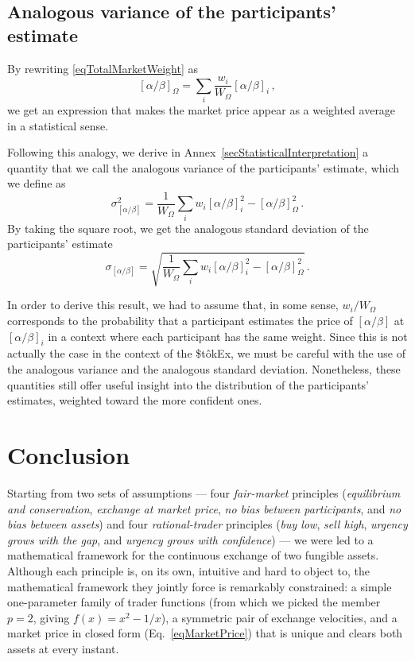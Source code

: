 \documentclass[letterpaper]{article}
\newcommand{\priceAB}{\left[\alpha / \beta\right]}
\newcommand{\StokEx}{\$t\^{o}kEx}
\begin{document}
\subsection{Analogous variance of the participants' estimate}

By rewriting \eqref{eqTotalMarketWeight} as
\begin{equation}
    \priceAB_\Omega = \sum_i \frac{w_i}{W_\Omega} \priceAB_i\,,
\end{equation}
we get an expression that makes the market price appear as a weighted average in a statistical sense.

Following this analogy, we derive in Annex~\ref{secStatisticalInterpretation} a quantity that we call the analogous variance of the participants' estimate, which we define as
\begin{equation}
    \sigma_{\priceAB}^2 = \frac{1}{W_\Omega} \sum_i w_i \priceAB_i^2 - \priceAB_\Omega^2\,.
\end{equation}
By taking the square root, we get the analogous standard deviation of the participants' estimate
\begin{equation}
    \sigma_{\priceAB} = \sqrt{\frac{1}{W_\Omega} \sum_i w_i \priceAB_i^2 - \priceAB_\Omega^2}\,.
\end{equation}

In order to derive this result, we had to assume that, in some sense, $w_i/W_\Omega$ corresponds to the probability that a participant estimates the price of $\priceAB$ at $\priceAB_i$ in a context where each participant has the same weight. Since this is not actually the case in the context of the \StokEx{}, we must be careful with the use of the analogous variance and the analogous standard deviation. Nonetheless, these quantities still offer useful insight into the distribution of the participants' estimates, weighted toward the more confident ones.

\section{Conclusion}

Starting from two sets of assumptions --- four \emph{fair-market} principles (\emph{equilibrium and conservation}, \emph{exchange at market price}, \emph{no bias between participants}, and \emph{no bias between assets}) and four \emph{rational-trader} principles (\emph{buy low}, \emph{sell high}, \emph{urgency grows with the gap}, and \emph{urgency grows with confidence}) --- we were led to a mathematical framework for the continuous exchange of two fungible assets.
Although each principle is, on its own, intuitive and hard to object to, the mathematical framework they jointly force is remarkably constrained: a simple one-parameter family of trader functions (from which we picked the member $p = 2$, giving $f(x) = x^2 - 1/x$), a symmetric pair of exchange velocities, and a market price in closed form (Eq.~\eqref{eqMarketPrice}) that is unique and clears both assets at every instant.
\end{document}
